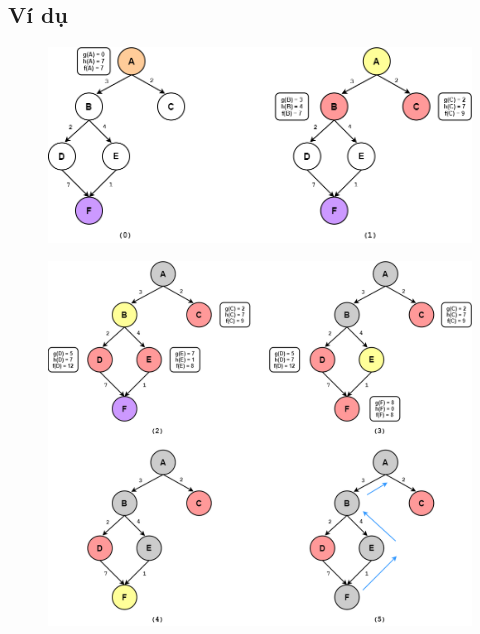\subsection{Ví dụ}

\begin{figure}[H]
    \centering
    \includegraphics[scale=0.5]{pic/A1.png}
    \label{fig:my_label}
\end{figure}
\begin{figure}[H]
    \centering
    \includegraphics[scale=0.5]{pic/A2.png}
    \label{fig:my_label}
\end{figure}
